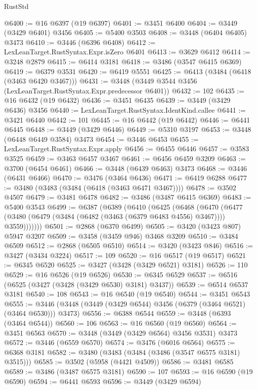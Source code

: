 \begin{lexlean}{RustStd}
\begin{coremodule}
{{{{{{{{{{{{{{{{{{{@6400 := @16 @6397 (@19 @6397)
@6401 := @3451 @6400
@6404 := @3449 (@3429 @6401) @3456
@6405 := @5400 @3503
@6408 := @3448 (@6404 @6405) @3473
@6410 := @3446 (@6396 @6408)
@6412 := LexLeanTarget.RustSyntax.Expr.isZero @6401
@6413 := @3629 @6412
@6414 := @3248 @2879
@6415 := @6414 @3181
@6418 := @3486 (@3547 @6415 @6369)
@6419 := @6379 @3531
@6420 := @6419 @5551
@6425 := @6413 (@3484 (@6418 (@3463 @6420 @3467)))
@6431 := @3448 (@3449 @3544 @3456 (LexLeanTarget.RustSyntax.Expr.predecessor @6401))
@6432 := 102
@6435 := @16 @6432 (@19 @6432)
@6436 := @3451 @6435
@6439 := @3449 (@3429 @6436) @3456
@6440 := LexLeanTarget.RustSyntax.IdentKind.callee
@6441 := @3421 @6440
@6442 := 101
@6445 := @16 @6442 (@19 @6442)
@6446 := @6441 @6445
@6448 := @3449 (@3429 @6446)
@6449 := @5310 @3197
@6453 := @3448 (@6448 @6449 @3584) @3473
@6454 := @3446 @6453
@6455 := LexLeanTarget.RustSyntax.Expr.apply
@6456 := @6455 @6446
@6457 := @3583 @3525
@6459 := @3463 @6457 @3467
@6461 := @6456 @6459 @3209
@6463 := @3700 (@6454 @6461)
@6466 := @3448 (@6439 @6463) @3473
@6468 := @3446 (@6431 @6466)
@6470 := @3476 (@3464 @6436)
@6471 := @6419 @6288
@6477 := @3480 (@3483 (@3484 (@6418 (@3463 @6471 @3467))))
@6478 := @3502 @4507
@6479 := @3481 @6478
@6482 := @3486 (@3487 @6415 @6369)
@6483 := @5400 @3543
@6499 := @6387
    (@6389
      (@6410
        (@6425
          (@6468
            (@6470
              (@6477 (@3480 (@6479 (@3484 (@6482 (@3463 (@6379 @6483 @4556) @3467)))) @3559)))))))
@6501 := @2868 (@6370 @6499)
@6505 := @3420 (@3423 @807) @5947 @3207
@6509 := @3458 (@3459 @946) @3468 @3209
@6510 := @3484 @6509
@6512 := @2868 (@6505 @6510)
@6514 := @3420 (@3423 @846)
@6516 := @3427 (@3434 @3224)
@6517 := 109
@6520 := @16 @6517 (@19 @6517)
@6521 := @6345 @6520
@6525 := @3427 (@3428 (@3429 @6521) @3181)
@6526 := 110
@6529 := @16 @6526 (@19 @6526)
@6530 := @6345 @6529
@6537 := @6516 (@6525 (@3427 (@3428 (@3429 @6530) @3181) @3437))
@6539 := @6514 @6537 @3181
@6540 := 108
@6543 := @16 @6540 (@19 @6540)
@6544 := @3451 @6543
@6555 := @3446 (@3448 (@3449 (@3429 @6544) @3456 (@6379 (@3464 @6521) (@3464 @6530))) @3473)
@6556 := @6388 @6544
@6559 := @3448 (@6393 (@3464 @6544))
@6560 := 106
@6563 := @16 @6560 (@19 @6560)
@6564 := @3451 @6563
@6570 := @3448 (@3449 (@3429 @6564) @3456 @3531) @3473
@6572 := @3446 (@6559 @6570)
@6574 := @3476 (@6016 @6564)
@6575 := @6368 @3181
@6582 := @3480 (@3483 (@3484 (@3486 (@3547 @6575 @3181) @3515)))
@6585 := @3502 (@5958 (@4421 @4509))
@6586 := @3481 @6585
@6589 := @3486 (@3487 @6575 @3181)
@6590 := 107
@6593 := @16 @6590 (@19 @6590)
@6594 := @6441 @6593
@6596 := @3449 (@3429 @6594)
}}}}}}}}}}}}}}}}}}}
\end{coremodule}
\end{lexlean}
